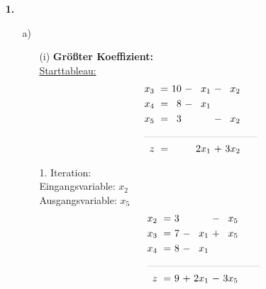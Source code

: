 \documentclass [a4paper,11pt]{article}
\author{\authorinfotitle}
\title{\titleinfo}
\date{\today}
\begin{document}
\maketitle
    \begin{enumerate}
        \item[\textbf{1.}]
        \begin{enumerate}
            \item[a)]
                \begin{enumerate}
                    \item[(i)]
                        \textbf{Größter Koeffizient:}\\
                        \underline{Starttableau:}
                        \begin{align*}
                        \begin{alignedat}{6}
                        && x_3 &\ = &\ 10 &\ - &\  x_1 &\ - &\  x_2 \\
                        && x_4 &\ = &\  8 &\ - &\  x_1 &    &       \\
                        && x_5 &\ = &\  3 &    &       &\ - &\  x_2 \\
                        &\rlap{\rule{4cm}{.1pt}} &&&&&&&\\
                        && z   &\ = &\    &    &\ 2x_1 &\ + &\ 3x_2
                        \end{alignedat}
                        \end{align*}

                        1. Iteration:\\
                        Eingangsvariable: $x_2$\\
                        Ausgangsvariable: $x_5$
                        \begin{align*}
                        \begin{alignedat}{6}
                        && x_2 &\ = &\  3 &    &       &\ - &\  x_5 \\
                        && x_3 &\ = &\  7 &\ - &\  x_1 &\ + &\  x_5 \\
                        && x_4 &\ = &\  8 &\ - &\  x_1 &    & \\
                        &\rlap{\rule{4cm}{.1pt}} &&&&&&&\\
                        && z   &\ = &\  9 &\ + &\ 2x_1 &\ - &\ 3x_5
                        \end{alignedat}
                        \end{align*}


\end{enumerate}
\end{enumerate}
\end{enumerate}
\end{document}
